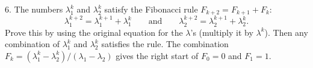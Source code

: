 6. The numbers \(\lambda_{1}^{k}\) and \(\lambda_{2}^{k}\) satisfy the Fibonacci rule \(F_{k+2}=F_{k+1}+F_{k}\): \[\lambda_{1}^{k+2}=\lambda_{1}^{k+1}+\lambda_{1}^{k}\qquad\text{and}\qquad \lambda_{2}^{k+2}=\lambda_{2}^{k+1}+\lambda_{2}^{k}.\] Prove this by using the original equation for the \(\lambda\)'s (multiply it by \(\lambda^{k}\)). Then any combination of \(\lambda_{1}^{k}\) and \(\lambda_{2}^{k}\) satisfies the rule. The combination \(F_{k}=(\lambda_{1}^{k}-\lambda_{2}^{k})/(\lambda_{1}-\lambda_{2})\) gives the right start of \(F_{0}=0\) and \(F_{1}=1\).

